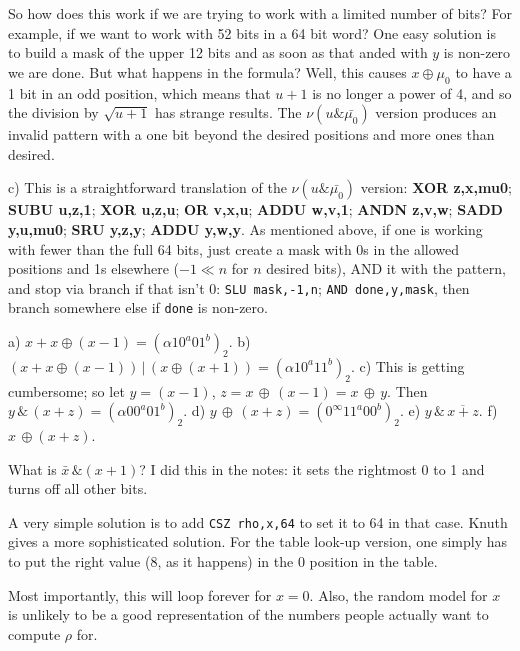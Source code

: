 So how does this work if we are trying to work with a limited number
of bits?  For example, if we want to work with 52 bits in a 64 bit word?
One easy solution is to build a mask of the upper 12 bits and as soon
as that anded with $y$ is non-zero we are done.  But what happens
in the formula?  Well, this causes $x \oplus \mu_0$ to have a 1 bit
in an odd position, which means that $u + 1$ is no longer a power of 4,
and so the division by $\sqrt{u+1}$ has strange results.  The 
$\nu\!\left(u \& \bar{\mu_0}\right)$ version produces an invalid pattern
with a one bit beyond the desired positions and more ones than desired.

\vskip 0.04in \noindent c) This is a straightforward translation of the $\nu\left(u \&
\bar{\mu_0}\right)$ version:
{\bf XOR z,x,mu0}; {\bf SUBU u,z,1}; {\bf XOR u,z,u}; {\bf OR v,x,u};
{\bf ADDU w,v,1}; {\bf ANDN z,v,w}; {\bf SADD y,u,mu0};
{\bf SRU y,z,y}; {\bf ADDU y,w,y}.  As mentioned above, if one is
working with fewer than the full 64 bits, just create a mask with 0s
in the allowed positions and 1s elsewhere ($-1 \ll n$ for $n$ desired bits),
AND it with the pattern, and stop via branch if that isn't 0:
{\tt SLU mask,-1,n}; {\tt AND done,y,mask}, then branch somewhere else if {\tt done} is
non-zero.

\vskip 0.08in  a) $x + x \oplus \left(x - 1\right) = 
\left(\alpha 1 0^a 0 1^b\right)_2$. b) $\left(x + x \oplus \left(x - 1\right)\right) \, | \, 
\left(x \oplus \left(x + 1\right)\right) = \left(\alpha 1 0^a 1 1^b\right)_2$.
c) This is getting cumbersome; so let $y = \left(x - 1\right)$, $z = x \, \oplus \, 
\left(x - 1\right) = x \, \oplus \, y$.  Then $y \, \& \, \left(x + z\right) =
\left(\alpha 0 0^a 0 1^b\right)_2$. d) $y \, \oplus \, \left(x + z \right) =
\left(0^{\infty} 1 1^a 0 0^b\right)_2$. e) $y \, \& \, \overline{x + z}$.
f) $x \, \oplus \left(x + z\right)$.

\vskip 0.08in  What is $\bar x \, \& \left(x + 1\right)$?
I did this in the notes: it sets the rightmost 0 to 1 and turns off all other bits.

\vskip 0.08in  A very simple solution is to add 
{\tt CSZ rho,x,64} to set it to 64 in that
case.  Knuth gives a more sophisticated solution.  For the table look-up
version, one simply has to put the right value (8, as it happens) 
in the 0 position in the table.

\vskip 0.08in  Most importantly, this will loop
forever for $x=0$.  Also, the random model for $x$ is unlikely to
be a good representation of the numbers people actually want to
compute $\rho$ for.

